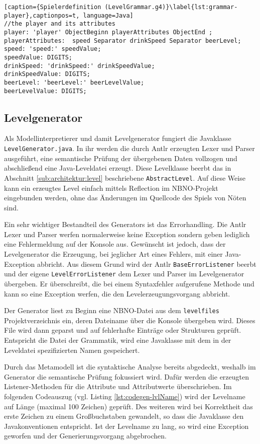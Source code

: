 \begin{lstlisting}[caption={Spielerdefinition (LevelGrammar.g4)}\label{lst:grammar-player},captionpos=t, language=Java] 
//the player and its attributes
player: 'player' ObjectBeginn playerAttributes ObjectEnd ;
playerAttributes:  speed Separator drinkSpeed Separator beerLevel;
speed: 'speed:' speedValue;
speedValue: DIGITS;
drinkSpeed: 'drinkSpeed:' drinkSpeedValue;
drinkSpeedValue: DIGITS;
beerLevel: 'beerLevel:' beerLevelValue;
beerLevelValue: DIGITS;
\end{lstlisting}

\subsection{Levelgenerator}

Als Modellinterpretierer und damit Levelgenerator fungiert die Javaklasse \texttt{LevelGenerator.java}.
In ihr werden die durch Antlr erzeugten Lexer und Parser ausgeführt, eine semantische Prüfung der übergebenen Daten vollzogen und abschließend eine Java-Leveldatei erzeugt.
Diese Levelklasse beerbt das in Abschnitt \ref{sub:architektur:level} beschriebene \texttt{AbstractLevel}. Auf diese Weise kann ein erzeugtes Level einfach mittels Reflection im NBNO-Projekt eingebunden werden, ohne das Änderungen im Quellcode des Spiels von Nöten sind.

Ein sehr wichtiger Bestandteil des Generators ist das \mbox{Errorhandling}. Die Antlr Lexer und Parser werfen normalerweise keine Exception sondern geben lediglich eine Fehlermeldung auf der Konsole aus.
Gewünscht ist jedoch, dass der Levelgenerator die Erzeugung, bei jeglicher Art eines Fehlers, mit einer Java-Exception abbricht. Aus diesem Grund wird der Antlr \texttt{BaseErrorListener} beerbt und der eigene \texttt{LevelErrorListener} dem Lexer und Parser im Levelgenerator übergeben. Er überschreibt, die bei einem Syntaxfehler aufgerufene Methode und kann so eine Exception werfen, die den Levelerzeugungsvorgang abbricht.

Der Generator liest zu Beginn eine NBNO-Datei aus dem \texttt{levelfiles} Projektverzeichnis ein, deren Dateiname über die Konsole übergeben wird. Dieses File wird dann geparst und auf fehlerhafte Einträge oder Strukturen geprüft. Entspricht die Datei der Grammatik, wird eine Javaklasse mit dem in der Leveldatei spezifizierten Namen gespeichert.

Durch das Metamodell ist die syntaktische Analyse bereits abgedeckt, weshalb im Generator die semantische Prüfung fokussiert wird. Dafür werden die erzeugten Listener-Methoden für die Attribute und Attributwerte überschrieben. Im folgenden Codeauszug (vgl. Listing \ref{lst:codegen-lvlName}) wird der Levelname auf Länge (maximal 100 Zeichen) geprüft. Des weiteren wird bei Korrektheit das erste Zeichen zu einem Großbuchstaben gewandelt, so dass die Javaklasse den Javakonventionen entspricht. Ist der Levelname zu lang, so wird eine Exception geworfen und der Generierungsvorgang abgebrochen.

